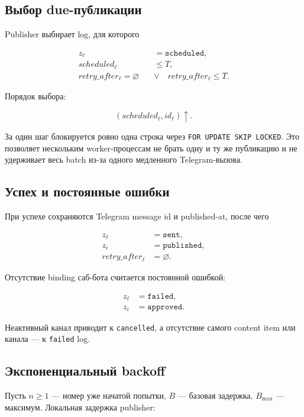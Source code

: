 \documentclass[12pt,a4paper]{article}
\newcommand{\Empty}{\varnothing}
\newcommand{\Status}[1]{\texttt{#1}}
\begin{document}
\subsection{Выбор due-публикации}

Publisher выбирает log, для которого

\begin{align}
  z_\ell&=\Status{scheduled},\\
  scheduled_\ell&\leq T,\\
  retry\_after_\ell=\Empty\quad&\lor\quad retry\_after_\ell\leq T.
\end{align}

Порядок выбора:

\begin{equation}
  (scheduled_\ell,id_\ell)\uparrow.
\end{equation}

За один шаг блокируется ровно одна строка через
\texttt{FOR UPDATE SKIP LOCKED}. Это позволяет нескольким worker-процессам не
брать одну и ту же публикацию и не удерживает весь batch из-за одного медленного
Telegram-вызова.

\subsection{Успех и постоянные ошибки}

При успехе сохраняются Telegram message id и published-at, после чего

\begin{align}
  z_\ell&=\Status{sent},\\
  z_i&=\Status{published},\\
  retry\_after_\ell&=\Empty.
\end{align}

Отсутствие binding саб-бота считается постоянной ошибкой:

\begin{align}
  z_\ell&=\Status{failed},\\
  z_i&=\Status{approved}.
\end{align}

Неактивный канал приводит к \Status{cancelled}, а отсутствие самого content item
или канала --- к \Status{failed} log.

\subsection{Экспоненциальный backoff}

Пусть $n\geq1$ --- номер уже начатой попытки, $B$ --- базовая задержка,
$B_{\max}$ --- максимум. Локальная задержка publisher:
\end{document}
